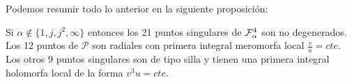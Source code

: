 Podemos resumir todo lo anterior en la siguiente proposición:

\begin{Proposicion}
\label{Prop:2}

Si $\alpha \notin \{1,j,j^{2},\infty \}$ entonces los 21 puntos singulares de $\Fol[4]{\alpha}$  son no degenerados. Los 12 puntos de $\mathcal{P}$ son radiales con primera integral meromorfa local $\frac{v}{u} = cte$. Los otros 9 puntos singulares son de tipo silla y tienen una primera integral holomorfa local de la forma $v^{3}u = cte$.

\end{Proposicion}




